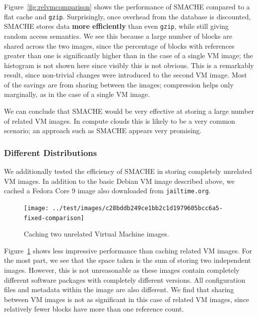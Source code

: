 \documentclass{sigplanconf}[11pt]
\begin{document}
Figure~\ref{fig:relvmcomparison} shows the performance of SMACHE compared to a flat
cache and {\tt gzip}.  Surprisingly, once overhead from the database is
discounted, SMACHE stores data {\bf more efficiently} than even {\tt gzip},
while still giving random access semantics.  We see this because a large number
of blocks are shared across the two images, since the percentage of blocks with
references greater than one is significantly higher than in the case of a
single VM image; the histogram is not shown here since visibly this is not
obvious.  This is a remarkably result, since non-trivial changes were introduced
to the second VM image.  Most of the savings are from sharing between the
images; compression helps only marginally, as in the case of a single VM image.

We can conclude that SMACHE would be very effective at storing a large number
of related VM images.  In compute clouds this is likely to be a very common
scenario; an approach such as SMACHE appears very promising.

\subsubsection*{Different Distributions}

We additionally tested the efficiency of SMACHE in storing completely unrelated
VM images.  In addition to the basic Debian VM image described above, we cached
a Fedora Core 9 image also downloaded from {\tt jailtime.org}.

\begin{figure}
\begin{center}
\texttt{[image: ../test/images/c28bddb249ce1bb2c1d1979605bcc6a5-fixed-comparison]}
\caption{\label{fig:difvmcomparison}Caching two unrelated Virtual Machine images.}
\end{center}
\end{figure}

Figure~\ref{fig:difvmcomparison} shows less impressive performance than caching
related VM images.  For the most part, we see that the space taken is the sum
of storing two independent images.  However, this is not unreasonable as these
images contain completely different software packages with completely different
versions.  All configuration files and metadata within the image are also
different.  We find that sharing between VM images is not as significant in
this case of related VM images, since relatively fewer blocks have more than
one reference count.
\end{document}
